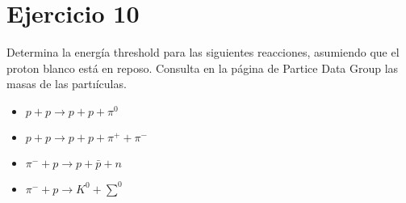 \section*{Ejercicio 10}
Determina la energía threshold para las siguientes reacciones, asumiendo que el proton blanco está
en reposo. Consulta en la página de Partice Data Group las masas de las partıículas.
\begin{itemize}
    \item $p+p \rightarrow p+p+\pi^0$
    \item $p+p \rightarrow p+p+\pi^++\pi^-$
    \item $\pi^-+p \rightarrow p+\bar{p}+n$
    \item $\pi^-+p \rightarrow K^0+\sum^0$
\end{itemize}